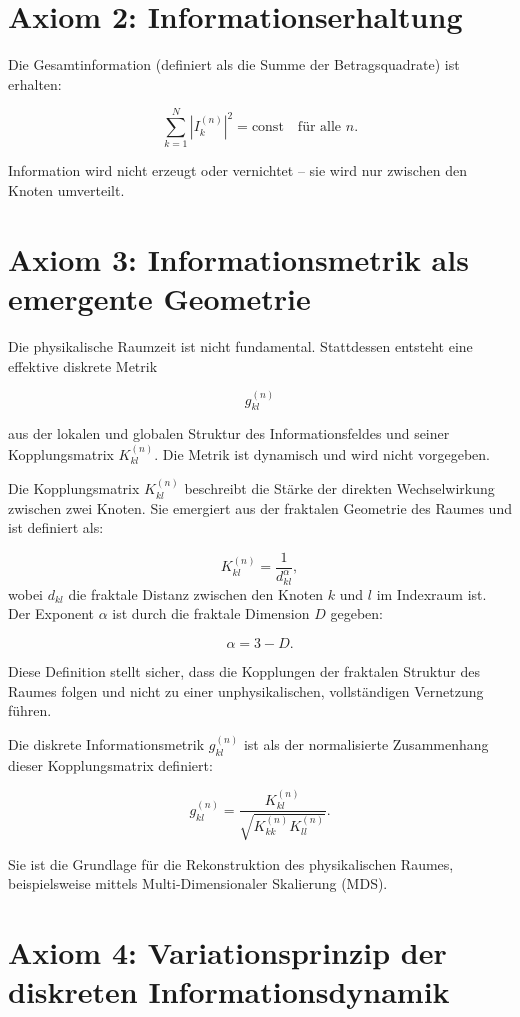 \section{Axiom 2: Informationserhaltung}
\label{sec:axiom2}

Die Gesamtinformation (definiert als die Summe der Betragsquadrate) ist erhalten:

\[
\sum_{k=1}^{N} |I_k^{(n)}|^2 = \text{const} \quad \text{für alle } n.
\]

Information wird nicht erzeugt oder vernichtet – sie wird nur zwischen den Knoten umverteilt.

\section{Axiom 3: Informationsmetrik als emergente Geometrie}
\label{sec:axiom3}

Die physikalische Raumzeit ist nicht fundamental. Stattdessen entsteht eine effektive diskrete Metrik

\[
g_{kl}^{(n)}
\]

aus der lokalen und globalen Struktur des Informationsfeldes und seiner Kopplungsmatrix \( K_{kl}^{(n)} \). Die Metrik ist dynamisch und wird nicht vorgegeben.

Die Kopplungsmatrix \( K_{kl}^{(n)} \) beschreibt die Stärke der direkten Wechselwirkung zwischen zwei Knoten. Sie emergiert aus der fraktalen Geometrie des Raumes und ist definiert als:

\[
K_{kl}^{(n)} = \frac{1}{d_{kl}^{\alpha}},
\]
wobei \( d_{kl} \) die fraktale Distanz zwischen den Knoten \( k \) und \( l \) im Indexraum ist. Der Exponent \( \alpha \) ist durch die fraktale Dimension \( D \) gegeben:

\[
\alpha = 3 - D.
\]

Diese Definition stellt sicher, dass die Kopplungen der fraktalen Struktur des Raumes folgen und nicht zu einer unphysikalischen, vollständigen Vernetzung führen.

Die diskrete Informationsmetrik \( g_{kl}^{(n)} \) ist als der normalisierte Zusammenhang dieser Kopplungsmatrix definiert:

\[
g_{kl}^{(n)} = \frac{K_{kl}^{(n)}}{\sqrt{K_{kk}^{(n)} K_{ll}^{(n)}}}.
\]

Sie ist die Grundlage für die Rekonstruktion des physikalischen Raumes, beispielsweise mittels Multi-Dimensionaler Skalierung (MDS).

\section{Axiom 4: Variationsprinzip der diskreten Informationsdynamik}
\label{sec:axiom4}

